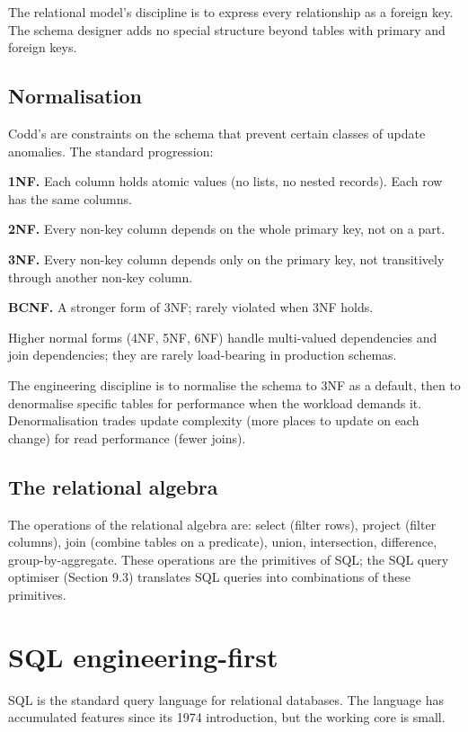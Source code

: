 The relational model's discipline is to express every relationship as a foreign key. The schema designer adds no special structure beyond tables with primary and foreign keys.

\subsection{Normalisation}

Codd's  are constraints on the schema that prevent certain classes of update anomalies. The standard progression:

\textbf{1NF.} Each column holds atomic values (no lists, no nested records). Each row has the same columns.

\textbf{2NF.} Every non-key column depends on the whole primary key, not on a part.

\textbf{3NF.} Every non-key column depends only on the primary key, not transitively through another non-key column.

\textbf{BCNF.} A stronger form of 3NF; rarely violated when 3NF holds.

Higher normal forms (4NF, 5NF, 6NF) handle multi-valued dependencies and join dependencies; they are rarely load-bearing in production schemas.

The engineering discipline is to normalise the schema to 3NF as a default, then to denormalise specific tables for performance when the workload demands it. Denormalisation trades update complexity (more places to update on each change) for read performance (fewer joins).

\subsection{The relational algebra}

The operations of the relational algebra are: select (filter rows), project (filter columns), join (combine tables on a predicate), union, intersection, difference, group-by-aggregate. These operations are the primitives of SQL; the SQL query optimiser (Section 9.3) translates SQL queries into combinations of these primitives.

\section{SQL engineering-first}

SQL is the standard query language for relational databases. The language has accumulated features since its 1974 introduction, but the working core is small.

